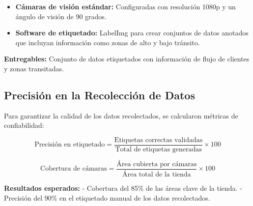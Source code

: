 \begin{itemize}
    \item \textbf{Cámaras de visión estándar:} Configuradas con resolución 1080p y un ángulo de visión de 90 grados.
    \item \textbf{Software de etiquetado:} LabelImg para crear conjuntos de datos anotados que incluyan información como zonas de alto y bajo tránsito.
    
\end{itemize}

\textbf{Entregables:} Conjunto de datos etiquetados con información de flujo de clientes y zonas transitadas.

\subsection{Precisión en la Recolección de Datos}

Para garantizar la calidad de los datos recolectados, se calcularon métricas de confiabilidad:

\begin{equation}
\text{Precisión en etiquetado} = \frac{\text{Etiquetas correctas validadas}}{\text{Total de etiquetas generadas}} \times 100
\end{equation}

\begin{equation}
\text{Cobertura de cámaras} = \frac{\text{Área cubierta por cámaras}}{\text{Área total de la tienda}} \times 100
\end{equation}

\textbf{Resultados esperados:}
- Cobertura del 85\% de las áreas clave de la tienda.
- Precisión del 90\% en el etiquetado manual de los datos recolectados.



